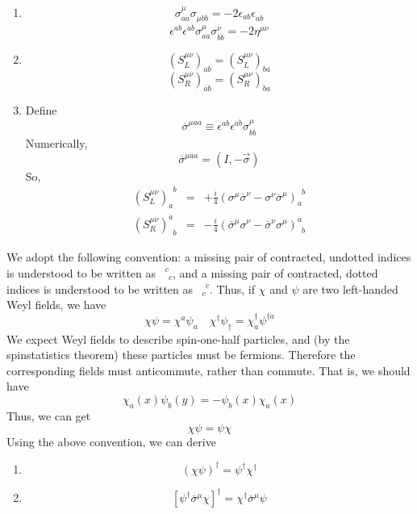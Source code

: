\documentclass[cyan]{elegantnote}
\begin{document}
\begin{newprop}
\begin{enumerate}
\item 
\[\sigma^{\mu}_{a\dot{a}} \sigma_{\mu b\dot{b}} = -2\epsilon_{ab} \epsilon_{\dot{a}\dot{b}}\]
\[\epsilon^{ab}\epsilon^{\dot{a}\dot{b}} \sigma^{\mu}_{a\dot{a}} \sigma^{\nu}_{b\dot{b}} = -2\eta^{\mu\nu}\]
\item \[(S_L^{\mu\nu})_{ab} = (S_L^{\mu\nu})_{ba}\]
\[(S_R^{\mu\nu})_{\dot{a}\dot{b}} = (S_R^{\mu\nu})_{\dot{b}\dot{a}}\]
\item Define
\[\overline{\sigma}^{\mu \dot{a} a} \equiv \epsilon^{ab} \epsilon^{\dot{a}\dot{b}} \sigma^{\mu}_{b\dot{b}}\]
Numerically,
\[\overline{\sigma}^{\mu \dot{a} a} = (I , -\vec{\sigma})\]
So,
\begin{eqnarray}
(S_L^{\mu\nu})_a^{\phantom{a}b} &=& + \frac{i}{4} (\sigma^{\mu} \overline{\sigma}^{\nu} - \sigma^{\nu} \overline{\sigma}^{\mu})_a^{\phantom{a}b} \nonumber \\
(S_R^{\mu\nu})^{\dot{a}}_{\phantom{\dot{a}} \dot{b}} &=& - \frac{i}{4}(\overline{\sigma}^{\mu}\sigma^{\nu} - \overline{\sigma}^{\nu} \sigma^{\mu})^{\dot{a}}_{\phantom{\dot{a}} \dot{b}} \nonumber
\end{eqnarray}
\end{enumerate}
\end{newprop}

\noindent
We adopt the following convention: a missing pair of contracted,
undotted indices is understood to be written as $\phantom{1}^c_{\phantom{c}c}$, and a missing pair of
contracted, dotted indices is understood to be written as $\phantom{1}_{\dot{c}}^{\phantom{c}\dot{c}}$. Thus, if $\chi$ and
$\psi$ are two left-handed Weyl fields, we have
\[\chi \psi = \chi^{a}\psi_{a} \quad \chi^{\dagger} \psi_{\dagger} = \chi^{\dagger}_{\dot{a}} \psi^{\dagger \dot{a}}\]
We expect Weyl fields to describe spin-one-half particles, and (by the spinstatistics theorem) these particles must be fermions. Therefore the corresponding fields must anticommute, rather than commute. That is, we should have
\[\chi_a(x) \psi_b(y) = - \psi_b(x) \chi_a(x)\]
Thus, we can get
\[\chi\psi = \psi\chi\]
Using the above convention, we can derive

\begin{newprop}
\begin{enumerate}
\item \[(\chi\psi)^{\dagger} = \psi^{\dagger}\chi^{\dagger}\]
\item \[[\psi^{\dagger} \overline{\sigma}^{\mu} \chi]^{\dagger} = \chi^{\dagger} \overline{\sigma}^{\mu} \psi\]
\end{enumerate}
\end{newprop}
\end{document}
